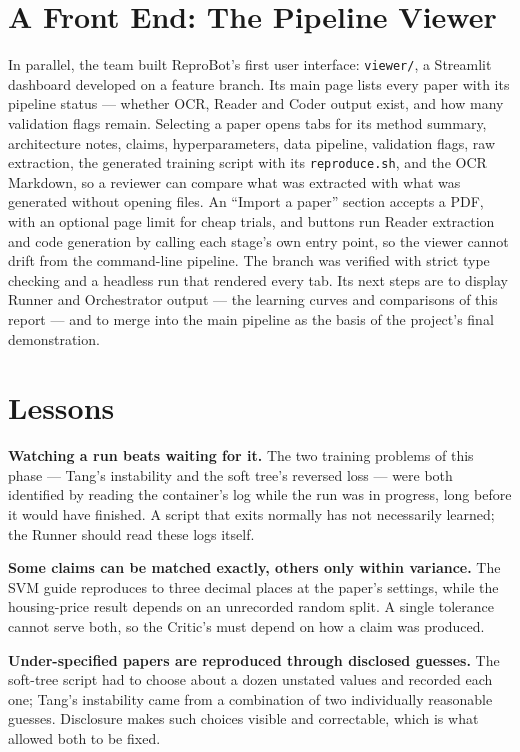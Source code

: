 \documentclass[10pt,twocolumn]{article}
\begin{document}
\section{A Front End: The Pipeline Viewer}
\label{sec:viewer}

In parallel, the team built ReproBot's first user interface: \texttt{viewer/}, a Streamlit
dashboard developed on a feature branch. Its main page lists every paper with its pipeline
status --- whether OCR, Reader and Coder output exist, and how many validation flags remain.
Selecting a paper opens tabs for its method summary, architecture notes, claims,
hyperparameters, data pipeline, validation flags, raw extraction, the generated training script
with its \texttt{reproduce.sh}, and the OCR Markdown, so a reviewer can compare what was
extracted with what was generated without opening files. An ``Import a paper'' section accepts
a PDF, with an optional page limit for cheap trials, and buttons run Reader extraction and code
generation by calling each stage's own entry point, so the viewer cannot drift from the
command-line pipeline. The branch was verified with strict type checking and a headless run
that rendered every tab. Its next steps are to display Runner and Orchestrator output --- the
learning curves and comparisons of this report --- and to merge into the main pipeline as the
basis of the project's final demonstration.

\section{Lessons}
\label{sec:lessons}

\textbf{Watching a run beats waiting for it.} The two training problems of this phase --- Tang's
instability and the soft tree's reversed loss --- were both identified by reading the
container's log while the run was in progress, long before it would have finished. A script
that exits normally has not necessarily learned; the Runner should read these logs itself.

\textbf{Some claims can be matched exactly, others only within variance.} The SVM guide
reproduces to three decimal places at the paper's settings, while the housing-price result
depends on an unrecorded random split. A single tolerance cannot serve both, so the Critic's
must depend on how a claim was produced.

\textbf{Under-specified papers are reproduced through disclosed guesses.} The soft-tree script
had to choose about a dozen unstated values and recorded each one; Tang's instability came from
a combination of two individually reasonable guesses. Disclosure makes such choices visible and
correctable, which is what allowed both to be fixed.
\end{document}
